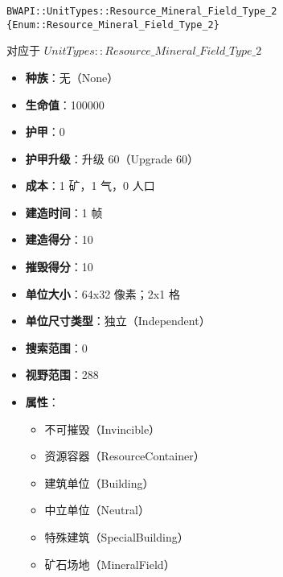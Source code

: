 \begin{tcolorbox}[colback=white, colframe=black!60!white, title=Resource\_Mineral\_Field\_Type\_2(), arc=0mm]
    \begin{verbatim}
BWAPI::UnitTypes::Resource_Mineral_Field_Type_2 {Enum::Resource_Mineral_Field_Type_2}
    \end{verbatim}
    对应于  $UnitTypes::Resource\_Mineral\_Field\_Type\_2$ 
    \begin{itemize}
        \item \textbf{种族}：无（None）
        \item \textbf{生命值}：100000
        \item \textbf{护甲}：0
        \item \textbf{护甲升级}：升级 60（Upgrade 60）
        \item \textbf{成本}：1 矿，1 气，0 人口
        \item \textbf{建造时间}：1 帧
        \item \textbf{建造得分}：10
        \item \textbf{摧毁得分}：10
        \item \textbf{单位大小}：64x32 像素；2x1 格
        \item \textbf{单位尺寸类型}：独立（Independent）
        \item \textbf{搜索范围}：0
        \item \textbf{视野范围}：288
        \item \textbf{属性}：
            \begin{itemize}
                \item 不可摧毁（Invincible）
                \item 资源容器（ResourceContainer）
                \item 建筑单位（Building）
                \item 中立单位（Neutral）
                \item 特殊建筑（SpecialBuilding）
                \item 矿石场地（MineralField）
            \end{itemize}
    \end{itemize}
\end{tcolorbox}

